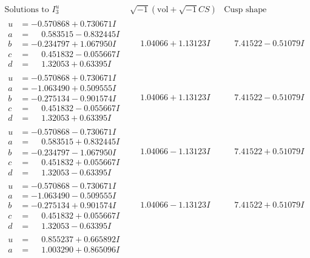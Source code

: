 \documentclass[1p]{elsarticle_modified}
\theoremstyle{definition}
\newcommand{\I}{\sqrt{-1}}
\begin{document}
$$\begin{array}{c|c|c}  
\text{Solutions to }I^u_{3}& \I (\text{vol} + \sqrt{-1}CS) & \text{Cusp shape}\\
 \hline 
\begin{aligned}
u &= -0.570868 + 0.730671 I \\
a &= \phantom{-}0.583515 - 0.832445 I \\
b &= -0.234797 + 1.067950 I \\
c &= \phantom{-}0.451832 - 0.055667 I \\
d &= \phantom{-}1.32053 + 0.63395 I\end{aligned}
 & \phantom{-}1.04066 + 1.13123 I & \phantom{-}7.41522 - 0.51079 I \\ \hline\begin{aligned}
u &= -0.570868 + 0.730671 I \\
a &= -1.063490 + 0.509555 I \\
b &= -0.275134 - 0.901574 I \\
c &= \phantom{-}0.451832 - 0.055667 I \\
d &= \phantom{-}1.32053 + 0.63395 I\end{aligned}
 & \phantom{-}1.04066 + 1.13123 I & \phantom{-}7.41522 - 0.51079 I \\ \hline\begin{aligned}
u &= -0.570868 - 0.730671 I \\
a &= \phantom{-}0.583515 + 0.832445 I \\
b &= -0.234797 - 1.067950 I \\
c &= \phantom{-}0.451832 + 0.055667 I \\
d &= \phantom{-}1.32053 - 0.63395 I\end{aligned}
 & \phantom{-}1.04066 - 1.13123 I & \phantom{-}7.41522 + 0.51079 I \\ \hline\begin{aligned}
u &= -0.570868 - 0.730671 I \\
a &= -1.063490 - 0.509555 I \\
b &= -0.275134 + 0.901574 I \\
c &= \phantom{-}0.451832 + 0.055667 I \\
d &= \phantom{-}1.32053 - 0.63395 I\end{aligned}
 & \phantom{-}1.04066 - 1.13123 I & \phantom{-}7.41522 + 0.51079 I \\ \hline\begin{aligned}
u &= \phantom{-}0.855237 + 0.665892 I \\
a &= \phantom{-}1.003290 + 0.865096 I \\

\end{aligned}
\end{array}$$
\end{document}
